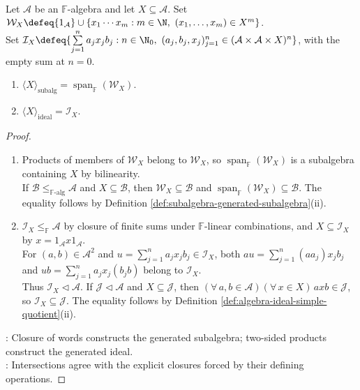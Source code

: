 \begin{proposition} \label{prop:generated-subalgebra-and-ideal-formulas} \\
Let $\mathcal{A}$ be an $\mathbb{F}$-algebra and let $X\subseteq\mathcal{A}$. Set $\mathcal{W}_X\defeq\{1_{\mathcal{A}}\}\cup\{x_1\cdots x_m:m\in\N,\ (x_1,\ldots,x_m)\in X^m\}$.\\
Set $\mathcal{I}_X\defeq\{\sum\limits_{j=1}^{n}a_jx_jb_j:n\in\N_0,\ (a_j,b_j,x_j)_{j=1}^{n}\in(\mathcal{A}\times\mathcal{A}\times X)^n\}$, with the empty sum at $n=0$.
\begin{enumerate}[label=(\roman*)]
\setlength{\itemsep}{0pt}
\item $\langle X\rangle_{\operatorname{subalg}}=\operatorname{span}_{\mathbb{F}}(\mathcal{W}_X)$.
\item $\langle X\rangle_{\operatorname{ideal}}=\mathcal{I}_X$.
\end{enumerate}
\begin{proof}
\begin{enumerate}[label=(\roman*)]
\setlength{\itemsep}{0pt}
\item Products of members of $\mathcal{W}_X$ belong to $\mathcal{W}_X$, so $\operatorname{span}_{\mathbb{F}}(\mathcal{W}_X)$ is a subalgebra containing $X$ by bilinearity.\\
If $\mathcal{B}\leq_{\mathbb{F}\text{-alg}}\mathcal{A}$ and $X\subseteq\mathcal{B}$, then $\mathcal{W}_X\subseteq\mathcal{B}$ and $\operatorname{span}_{\mathbb{F}}(\mathcal{W}_X)\subseteq\mathcal{B}$. The equality follows by Definition \ref{def:subalgebra-generated-subalgebra}(ii).
\item $\mathcal{I}_X\leq_{\mathbb{F}}\mathcal{A}$ by closure of finite sums under $\mathbb{F}$-linear combinations, and $X\subseteq\mathcal{I}_X$ by $x=1_{\mathcal{A}}x1_{\mathcal{A}}$.\\
For $(a,b)\in\mathcal{A}^2$ and $u=\sum\limits_{j=1}^{n}a_jx_jb_j\in\mathcal{I}_X$, both $au=\sum\limits_{j=1}^{n}(aa_j)x_jb_j$ and $ub=\sum\limits_{j=1}^{n}a_jx_j(b_jb)$ belong to $\mathcal{I}_X$.\\
Thus $\mathcal{I}_X\triangleleft\mathcal{A}$. If $\mathcal{J}\triangleleft\mathcal{A}$ and $X\subseteq\mathcal{J}$, then $(\forall\,a,b\in\mathcal{A})(\forall\,x\in X)\,axb\in\mathcal{J}$, so $\mathcal{I}_X\subseteq\mathcal{J}$. The equality follows by Definition \ref{def:algebra-ideal-simple-quotient}(ii).
\end{enumerate}
: Closure of words constructs the generated subalgebra; two-sided products construct the generated ideal.\\
: Intersections agree with the explicit closures forced by their defining operations.
\end{proof}
\end{proposition}

